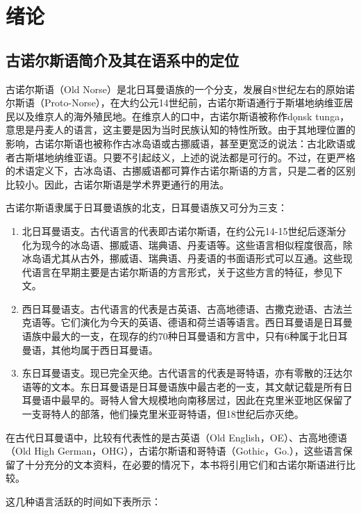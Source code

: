 \chapter*{绪论}
\section*{古诺尔斯语简介及其在语系中的定位}
古诺尔斯语（Old Norse）是北日耳曼语族的一个分支，发展自8世纪左右的原始诺尔斯语（Proto-Norse），在大约公元14世纪前，古诺尔斯语通行于斯堪地纳维亚居民以及维京人的海外殖民地。在维京人的口中，古诺尔斯语被称作dǫnsk tunga，意思是丹麦人的语言，这主要是因为当时民族认知的特性所致。由于其地理位置的影响，古诺尔斯语也被称作古冰岛语或古挪威语，甚至更宽泛的说法：古北欧语或者古斯堪地纳维亚语。只要不引起歧义，上述的说法都是可行的。不过，在更严格的术语定义下，古冰岛语、古挪威语都可算作古诺尔斯语的方言，只是二者的区别比较小。因此，古诺尔斯语是学术界更通行的用法。

古诺尔斯语隶属于日耳曼语族的北支，日耳曼语族又可分为三支：
\begin{enumerate}
    \item 北日耳曼语支。古代语言的代表即古诺尔斯语，在约公元14-15世纪后逐渐分化为现今的冰岛语、挪威语、瑞典语、丹麦语等。这些语言相似程度很高，除冰岛语尤其从古外，挪威语、瑞典语、丹麦语的书面语形式可以互通。这些现代语言在早期主要是古诺尔斯语的方言形式，关于这些方言的特征，参见下文。

    \item 西日耳曼语支。古代语言的代表是古英语、古高地德语、古撒克逊语、古法兰克语等。它们演化为今天的英语、德语和荷兰语等语言。西日耳曼语是日耳曼语族中最大的一支，在现存的约70种日耳曼语和方言中，只有6种属于北日耳曼语，其他均属于西日耳曼语。

    \item 东日耳曼语支。现已完全灭绝。古代语言的代表是哥特语，亦有零散的汪达尔语等的文本。东日耳曼语是日耳曼语族中最古老的一支，其文献记载是所有日耳曼语中最早的。哥特人曾大规模地向南移居过，因此在克里米亚地区保留了一支哥特人的部落，他们操克里米亚哥特语，但18世纪后亦灭绝。
\end{enumerate}

在古代日耳曼语中，比较有代表性的是古英语（Old English，OE）、古高地德语（Old High German，OHG），古诺尔斯语和哥特语（Gothic，Go.），这些语言保留了十分充分的文本资料，在必要的情况下，本书将引用它们和古诺尔斯语进行比较。

这几种语言活跃的时间如下表所示：

